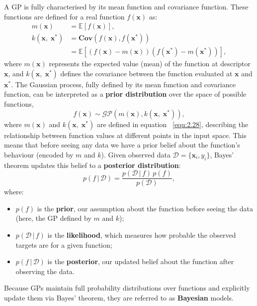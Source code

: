 A GP is fully characterised by its mean function and covariance function.
These functions are defined for a real function $f(\mathbf{x})$ as:
\begin{equation}
    \label{equ:2.28}
    \begin{split}
     m(\mathbf{x}) &= \mathbb{E}[f(\mathbf{x})],\\
     k(\mathbf{x},\;\mathbf{x}^{*}) &=\mathbf{Cov}\left(f(\mathbf{x}), f(\mathbf{x}^{*})\right)\\
     &= \mathbb{E}[(f(\mathbf{x}) - m(\mathbf{x}))(f(\mathbf{x}^{*}) - m(\mathbf{x}^{*}))],
    \end{split}
\end{equation}
where $m(\mathbf{x})$ represents the expected value (mean) of the function at descriptor $\mathbf{x}$, and $k(\mathbf{x},\;\mathbf{x}^{*})$ defines the covariance between the function evaluated at $\mathbf{x}$ and $\mathbf{x}^{*}$.
The Gaussian process, fully defined by its mean function and covariance function, can be interpreted as a \textbf{prior distribution} over the space of possible functions,
\begin{equation}
    \label{equ:2.29}
    f(\mathbf{x}) \sim \mathcal{GP} \left( m(\mathbf{x}), k(\mathbf{x},\; \mathbf{x}^{*}) \right),
\end{equation}
where $m(\mathbf{x})$ and $k(\mathbf{x},\;\mathbf{x}^{*})$ are defined in equation ~\eqref{equ:2.28}, describing the relationship between function values at different points in the input space.
This means that before seeing any data we have a prior belief about the function’s behaviour (encoded by $m$ and $k$). 
Given observed data $\mathcal{D}=\{\mathbf{x}_i,y_i\}$, Bayes’ theorem updates this belief to a \textbf{posterior distribution}:
\begin{equation}
\label{equ:bayes}
p(f\,|\,\mathcal{D}) = \frac{p(\mathcal{D}\,|\,f)\,p(f)}{p(\mathcal{D})},
\end{equation}
where:
\begin{itemize}
  \item $p(f)$ is the \textbf{prior}, our assumption about the function before seeing the data (here, the GP defined by $m$ and $k$);
  \item $p(\mathcal{D}\,|\,f)$ is the \textbf{likelihood}, which measures how probable the observed targets are for a given function;
  \item $p(f\,|\,\mathcal{D})$ is the \textbf{posterior}, our updated belief about the function after observing the data.
\end{itemize}
Because GPs maintain full probability distributions over functions and explicitly update them via Bayes’ theorem, they are referred to as \textbf{Bayesian} models.

